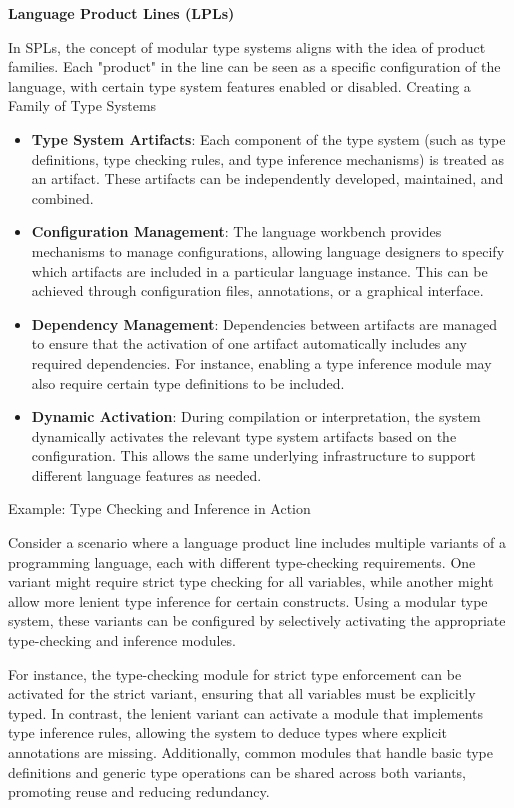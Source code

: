 \noindent \textbf{Language Product Lines (LPLs)}

In SPLs, the concept of modular type systems aligns with the idea of product families. Each "product" in the line can be seen as a specific configuration of the language, with certain type system features enabled or disabled.
Creating a Family of Type Systems

\begin{itemize}
    \item \textbf{Type System Artifacts}: Each component of the type system (such as type definitions, type checking rules, and type inference mechanisms) is treated as an artifact. These artifacts can be independently developed, maintained, and combined.
    \item \textbf{Configuration Management}: The language workbench provides mechanisms to manage configurations, allowing language designers to specify which artifacts are included in a particular language instance. This can be achieved through configuration files, annotations, or a graphical interface.
    \item \textbf{Dependency Management}: Dependencies between artifacts are managed to ensure that the activation of one artifact automatically includes any required dependencies. For instance, enabling a type inference module may also require certain type definitions to be included.
    \item \textbf{Dynamic Activation}: During compilation or interpretation, the system dynamically activates the relevant type system artifacts based on the configuration. This allows the same underlying infrastructure to support different language features as needed.
\end{itemize}

\noindent Example: Type Checking and Inference in Action

Consider a scenario where a language product line includes multiple variants of a programming language, each with different type-checking requirements. One variant might require strict type checking for all variables, while another might allow more lenient type inference for certain constructs. Using a modular type system, these variants can be configured by selectively activating the appropriate type-checking and inference modules.

For instance, the type-checking module for strict type enforcement can be activated for the strict variant, ensuring that all variables must be explicitly typed. In contrast, the lenient variant can activate a module that implements type inference rules, allowing the system to deduce types where explicit annotations are missing. Additionally, common modules that handle basic type definitions and generic type operations can be shared across both variants, promoting reuse and reducing redundancy.

